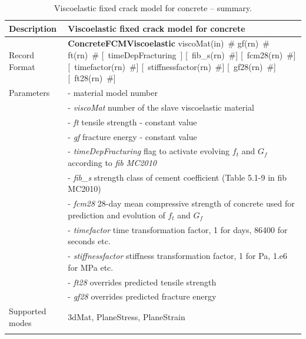 \documentclass[a4paper]{article}
\newcommand{\descitem}[1]{{\noindent \bf #1}}
\newcommand{\elemparam}[2]{{{#1\tiny (#2)}~\#}}
\newcommand{\optelemparam}[2]{[{~\elemparam{#1}{#2}}]}
\newcommand{\elemstring}[1]{{#1}}
\newcommand{\optelemstring}[1]{[{~\elemstring{#1}~}]}
\newcommand{\param}[1]{{\it #1}}
\begin{document}
\begin{longtable}{|l|p{9cm}|}
\hline
Description & Viscoelastic fixed crack model for concrete\\
\hline
Record Format & \descitem{ConcreteFCMViscoelastic} 
\elemparam{viscoMat}{in}
\elemparam{gf}{rn}
\elemparam{ft}{rn}
\optelemstring{timeDepFracturing}
\optelemparam{fib\_s}{rn}
\optelemparam{fcm28}{rn}
\optelemparam{timefactor}{rn}
\optelemparam{stiffnessfactor}{rn}
\optelemparam{gf28}{rn}
\optelemparam{ft28}{rn}
\\
Parameters &- \param{} material model number\\
&- \param{viscoMat} number of the slave viscoelastic material\\
&- \param{ft} tensile strength - constant value\\
&- \param{gf} fracture energy - constant value\\
&- \param{timeDepFracturing} flag to activate evolving $f_t$ and $G_f$
according to \emph{fib MC2010}\\
&- \param{fib\_s} strength class of cement coefficient (Table 5.1-9 in
fib MC2010)\\
&- \param{fcm28} 28-day mean compressive strength of concrete used for
prediction and evolution of $f_t$ and $G_f$\\
&- \param{timefactor} time transformation factor, 1 for days,
86400 for seconds etc.\\
&- \param{stiffnessfactor} stiffness transformation factor, 1 for Pa,
1.e6 for MPa etc.\\
&- \param{ft28} overrides predicted tensile strength\\
&- \param{gf28} overrides predicted fracture energy\\
Supported modes& 3dMat, PlaneStress, PlaneStrain\\
\hline
\caption{Viscoelastic fixed crack model for concrete -- summary.}
\label{concretefcmviscoelastic_table}
\end{longtable}
%
\end{document}
